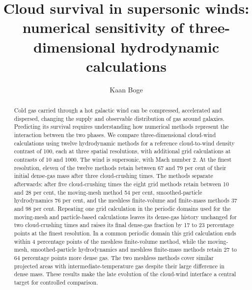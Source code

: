 \documentclass[twocolumn,apj,numberedappendix]{openjournal}
\begin{document}
\title{Cloud survival in supersonic winds: numerical sensitivity of three-dimensional hydrodynamic calculations}
\author{Kaan Boge}
\begin{abstract}
Cold gas carried through a hot galactic wind can be compressed, accelerated and dispersed, changing the supply and observable distribution of gas around galaxies. Predicting its survival requires understanding how numerical methods represent the interaction between the two phases. We compare three-dimensional cloud-wind calculations using twelve hydrodynamic methods for a reference cloud-to-wind density contrast of 100, each at three spatial resolutions, with additional grid calculations at contrasts of 10 and 1000. The wind is supersonic, with Mach number 2. At the finest resolution, eleven of the twelve methods retain between 67 and 79 per cent of their initial dense-gas mass after three cloud-crushing times. The methods separate afterwards: after five cloud-crushing times the eight grid methods retain between 10 and 28 per cent, the moving-mesh method 54 per cent, smoothed-particle hydrodynamics 76 per cent, and the meshless finite-volume and finite-mass methods 37 and 98 per cent. Repeating one grid calculation in the periodic domains used for the moving-mesh and particle-based calculations leaves its dense-gas history unchanged for two cloud-crushing times and raises its final dense-gas fraction by 17 to 23 percentage points at the finest resolution. In a common periodic domain this grid calculation ends within 4 percentage points of the meshless finite-volume method, while the moving-mesh, smoothed-particle hydrodynamics and meshless finite-mass methods retain 27 to 64 percentage points more dense gas. The two meshless methods cover similar projected areas with intermediate-temperature gas despite their large difference in dense mass. These results make the late evolution of the cloud-wind interface a central target for controlled comparison.
\end{abstract}
\maketitle
\end{document}
